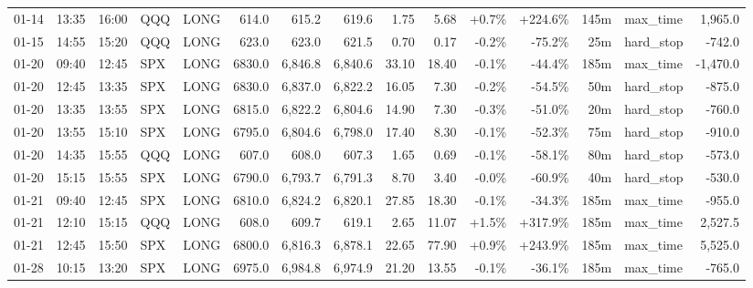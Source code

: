 \documentclass[11pt,a4paper,twoside]{article}
\begin{document}
\begin{landscape}
\begin{center}
\begin{longtable}{>{\color{txtmain}}l l l l l r r r r r r r r >{\color{txtmain}}l r}
01-14 & 13:35 & 16:00 & QQQ & LONG & 614.0 & 615.2 & 619.6 & 1.75 & 5.68 & \textcolor{wingreen}{+0.7\%} & \textcolor{wingreen}{+224.6\%} & 145m & max\_time & \textcolor{wingreen}{1,965.0} \\
01-15 & 14:55 & 15:20 & QQQ & LONG & 623.0 & 623.0 & 621.5 & 0.70 & 0.17 & \textcolor{lossred}{-0.2\%} & \textcolor{lossred}{-75.2\%} & 25m & hard\_stop & \textcolor{lossred}{-742.0} \\
01-20 & 09:40 & 12:45 & SPX & LONG & 6830.0 & 6,846.8 & 6,840.6 & 33.10 & 18.40 & \textcolor{lossred}{-0.1\%} & \textcolor{lossred}{-44.4\%} & 185m & max\_time & \textcolor{lossred}{-1,470.0} \\
01-20 & 12:45 & 13:35 & SPX & LONG & 6830.0 & 6,837.0 & 6,822.2 & 16.05 & 7.30 & \textcolor{lossred}{-0.2\%} & \textcolor{lossred}{-54.5\%} & 50m & hard\_stop & \textcolor{lossred}{-875.0} \\
01-20 & 13:35 & 13:55 & SPX & LONG & 6815.0 & 6,822.2 & 6,804.6 & 14.90 & 7.30 & \textcolor{lossred}{-0.3\%} & \textcolor{lossred}{-51.0\%} & 20m & hard\_stop & \textcolor{lossred}{-760.0} \\
01-20 & 13:55 & 15:10 & SPX & LONG & 6795.0 & 6,804.6 & 6,798.0 & 17.40 & 8.30 & \textcolor{lossred}{-0.1\%} & \textcolor{lossred}{-52.3\%} & 75m & hard\_stop & \textcolor{lossred}{-910.0} \\
01-20 & 14:35 & 15:55 & QQQ & LONG & 607.0 & 608.0 & 607.3 & 1.65 & 0.69 & \textcolor{lossred}{-0.1\%} & \textcolor{lossred}{-58.1\%} & 80m & hard\_stop & \textcolor{lossred}{-573.0} \\
01-20 & 15:15 & 15:55 & SPX & LONG & 6790.0 & 6,793.7 & 6,791.3 & 8.70 & 3.40 & \textcolor{lossred}{-0.0\%} & \textcolor{lossred}{-60.9\%} & 40m & hard\_stop & \textcolor{lossred}{-530.0} \\
01-21 & 09:40 & 12:45 & SPX & LONG & 6810.0 & 6,824.2 & 6,820.1 & 27.85 & 18.30 & \textcolor{lossred}{-0.1\%} & \textcolor{lossred}{-34.3\%} & 185m & max\_time & \textcolor{lossred}{-955.0} \\
01-21 & 12:10 & 15:15 & QQQ & LONG & 608.0 & 609.7 & 619.1 & 2.65 & 11.07 & \textcolor{wingreen}{+1.5\%} & \textcolor{wingreen}{+317.9\%} & 185m & max\_time & \textcolor{wingreen}{2,527.5} \\
01-21 & 12:45 & 15:50 & SPX & LONG & 6800.0 & 6,816.3 & 6,878.1 & 22.65 & 77.90 & \textcolor{wingreen}{+0.9\%} & \textcolor{wingreen}{+243.9\%} & 185m & max\_time & \textcolor{wingreen}{5,525.0} \\
01-28 & 10:15 & 13:20 & SPX & LONG & 6975.0 & 6,984.8 & 6,974.9 & 21.20 & 13.55 & \textcolor{lossred}{-0.1\%} & \textcolor{lossred}{-36.1\%} & 185m & max\_time & \textcolor{lossred}{-765.0} \\

\end{longtable}
\end{center}
\end{landscape}
\end{document}
